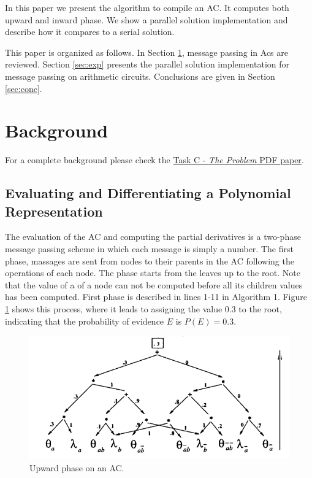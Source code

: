\documentclass[twoside,11pt]{article}
\begin{document}
In this paper we present the algorithm to compile an AC.
It computes both upward and inward phase.
We show a parallel solution implementation and describe how it compares to a serial solution.

This paper is organized as follows.
In Section \ref{sec:background}, message passing in Acs are reviewed.
Section \ref{sec:exp} presents the parallel solution implementation for message passing on arithmetic circuits.
Conclusions are given in Section \ref{sec:conc}.


\section{Background}
\label{sec:background}

For a complete background please check the \href{https://github.com/andreeds/cs807-research-tasks/blob/master/C\%20-\%20The\%20Problem/Paper/Task_C_Andre_200334126.pdf}{Task C - \emph{The Problem} PDF paper}.


\subsection{Evaluating and Differentiating a Polynomial Representation}
\label{sec:eval}

The evaluation of the AC and computing the partial derivatives is a two-phase message passing scheme in which each message is simply a number.
The first phase, massages are sent from nodes to their parents in the AC following the operations of each node.
The phase starts from the leaves up to the root.
Note that the value of a of a node can not be computed before all its children values has been computed.
First phase is described in lines 1-11 in Algorithm 1.
Figure \ref{fig:comp} shows this process, where it leads to assigning the value 0.3 to the root, indicating that the probability of evidence $E$ is $P(E) = 0.3$.

\begin{figure}[!htb]
    \begin{center}
    	\includegraphics[width=\columnwidth]{figures/compiled.png}
		\caption{Upward phase on an AC.}
		\label{fig:comp}
    \end{center}
\end{figure}
\end{document}

